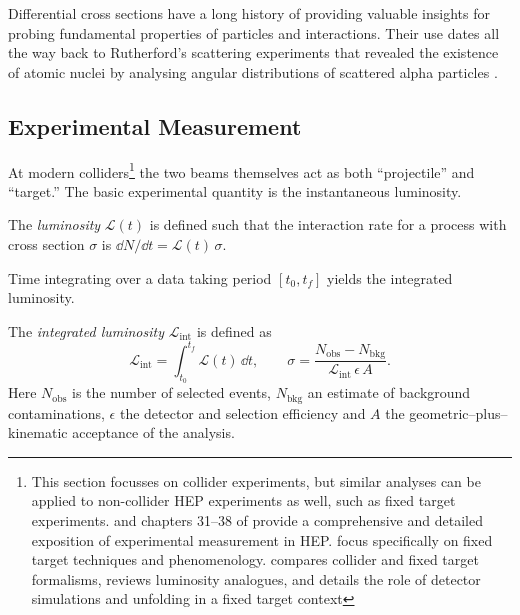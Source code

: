 \begin{definition}
Differential cross sections have a long history of providing valuable insights for probing fundamental properties of particles and interactions.
%
Their use dates all the way back to Rutherford's scattering experiments that revealed the existence of atomic nuclei by analysing angular distributions of scattered alpha particles \cite{F.R.S.1911LXXIX.Atom}.

    \subsection{Experimental Measurement}
    \label{subsec:exp_measurement}
        At modern colliders\footnote{
            This section focusses on collider experiments, but similar analyses can be applied to non-collider HEP experiments as well, such as fixed target experiments.
            \cite{leo_techniques_1994} and chapters \numrange{31}{38} of \cite{particle_data_group_review_2022} provide a comprehensive and detailed exposition of experimental measurement in HEP.
            \cite{Brodsky2013PhysicsBeams, AveryCrossRates} focus specifically on fixed target techniques and phenomenology.
            \cite{MuheimNuclearLaws} compares collider and fixed target formalisms, reviews luminosity analogues, and details the role of detector simulations and unfolding in a fixed target context
        } the two beams themselves act as both ``projectile'' and ``target.'' 
        The basic experimental quantity is the instantaneous luminosity.
        \begin{definition}
            The \emph{luminosity} \(\mathcal{L}(t)\) is defined such that the interaction rate for a process with cross section \(\sigma\) is \(\dd N/\dd t = \mathcal{L}(t)\,\sigma\).
        \end{definition}

        Time integrating over a data taking period \([t_0, t_f]\) yields the integrated luminosity.
        \begin{definition}
            The \emph{integrated luminosity} \(\mathcal{L}_{\text{int}}\) is defined as
            \begin{equation}
                \mathcal{L}_{\text{int}}
                = \int_{t_0}^{t_f} \mathcal{L}(t)\,\dd t,
                \qquad
                \sigma
                = \frac{N_{\text{obs}} - N_{\text{bkg}}}
                       {\mathcal{L}_{\text{int}}\,\epsilon\,A}.
                \label{eq:crossec_collider}
              \end{equation}
              Here \(N_{\text{obs}}\) is the number of selected events, \(N_{\text{bkg}}\) an estimate of background contaminations, \(\epsilon\) the detector and selection efficiency and \(A\) the geometric--plus--kinematic acceptance of the analysis.
        \end{definition}



\end{definition}
